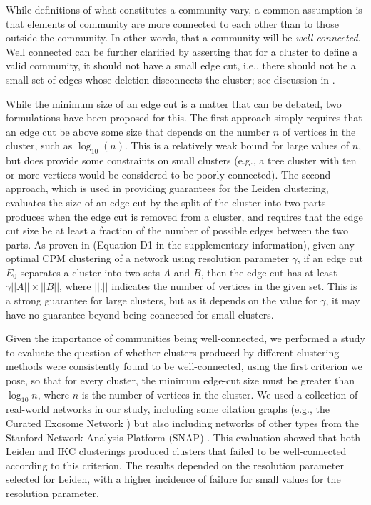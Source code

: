 \documentclass[12pt, oneside]{article}   	%
\begin{document}
While definitions of what constitutes a community vary, a common assumption is that elements of community are more connected to each other than to those outside the community. 
In other words, that a community will be {\em well-connected}. Well connected can be further clarified by asserting that for a cluster to define a valid community, it  should not have a small 
edge cut, i.e., there should not be a small set of edges whose deletion disconnects the cluster; see discussion in \citep{Traag_2019}. 


While the minimum size of an edge cut is a matter that can be debated, two formulations have been proposed for this.
The first approach simply requires that an edge cut be above some size that depends on the number $n$ of vertices in the cluster, such as $\log_{10}(n)$. 
This is a relatively weak bound for large values of $n$, but does provide some constraints on small clusters (e.g., a tree cluster with ten or more vertices would be considered to be poorly connected).  
The second approach, which is used in providing guarantees for the Leiden clustering, evaluates the size of an edge cut by the split  of the cluster into two parts produces when the edge cut is removed from a cluster, and requires that the
edge cut size be at least a fraction of the number of possible edges between the two  parts.
As proven in \citep{Traag_2019} (Equation D1 in the supplementary information), 
given any optimal CPM clustering of a network using resolution parameter $\gamma$, if an edge cut $E_0$
separates a cluster into two sets $A$ and $B$, then the edge cut has at least $\gamma ||A|| \times ||B||$, where
$||.||$ indicates the number of vertices in the given set.
This is a strong guarantee for large clusters,  but as it depends on the value for $\gamma$, it may have no guarantee  beyond being connected for small clusters. 

Given the importance of communities being well-connected, we performed a study to evaluate the question of whether clusters produced by different clustering methods
were consistently found to be well-connected, using the first criterion we pose, so that for every cluster, the minimum edge-cut size must be greater than $\log_{10}n$, where $n$ is the number of vertices in the cluster. 
We used a collection of real-world networks in our study, including some citation graphs (e.g., the Curated Exosome Network \citep{Wedell2022})  but also including networks of other types from the Stanford Network Analysis Platform (SNAP) \citep{leskovec2016snap}.
This evaluation showed that both Leiden and IKC clusterings produced clusters that failed to be well-connected according to this criterion.
The results depended on the resolution parameter selected for Leiden,  with a higher incidence of failure for small values for the resolution parameter.
\end{document}
